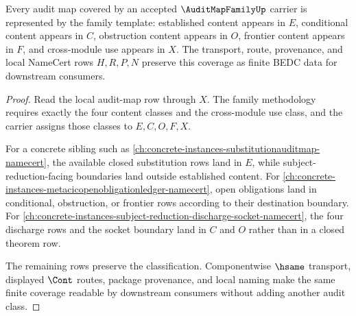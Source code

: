 \begin{theorem}
\label{thm:audit-map-family-template-coverage}
Every audit map covered by an accepted $\AuditMapFamilyUp$ carrier is represented by the family template: established content appears in $E$, conditional content appears in $C$, obstruction content appears in $O$, frontier content appears in $F$, and cross-module use appears in $X$. The transport, route, provenance, and local NameCert rows $H,R,P,N$ preserve this coverage as finite BEDC data for downstream consumers.
\end{theorem}
\begin{proof}
Read the local audit-map row through $X$. The family methodology requires exactly the four content classes and the cross-module use class, and the carrier assigns those classes to $E,C,O,F,X$.

For a concrete sibling such as \autoref{ch:concrete-instances-substitutionauditmap-namecert}, the available closed substitution rows land in $E$, while subject-reduction-facing boundaries land outside established content. For \autoref{ch:concrete-instances-metacicopenobligationledger-namecert}, open obligations land in conditional, obstruction, or frontier rows according to their destination boundary. For \autoref{ch:concrete-instances-subject-reduction-discharge-socket-namecert}, the four discharge rows and the socket boundary land in $C$ and $O$ rather than in a closed theorem row.

The remaining rows preserve the classification. Componentwise $\hsame$ transport, displayed $\Cont$ routes, package provenance, and local naming make the same finite coverage readable by downstream consumers without adding another audit class.
\end{proof}

